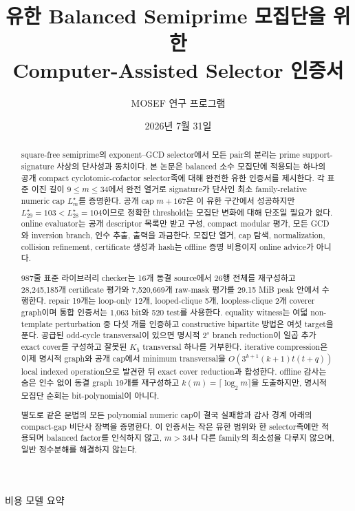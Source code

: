 \documentclass[11pt]{article}
\title{유한 Balanced Semiprime 모집단을 위한\\
Computer-Assisted Selector 인증서}
\author{MOSEF 연구 프로그램}
\date{2026년 7월 31일}
\begin{document}
\maketitle

\begin{abstract}
square-free semiprime의 exponent--GCD selector에서 모든 pair의 분리는
prime support-signature 사상의 단사성과 동치이다. 본 논문은 balanced
소수 모집단에 적용되는 하나의 공개 compact cyclotomic-cofactor
selector족에 대해 완전한 유한 인증서를 제시한다. 각 표준 이진 길이
\(9\le m\le34\)에서 완전 열거로 signature가 단사인 최소
family-relative numeric cap \(L_m^\star\)를 증명한다. 공개 cap
\(m+167\)은 이 유한 구간에서 성공하지만
\(L_{29}^\star=103<L_{28}^\star=104\)이므로 정확한 threshold는
모집단 변화에 대해 단조일 필요가 없다. online evaluator는 공개
descriptor 목록만 받고 구성, compact modular 평가, 모든 GCD와
inversion branch, 인수 추출, 출력을 과금한다. 모집단 열거, cap 탐색,
normalization, collision refinement, certificate 생성과 hash는 offline
증명 비용이지 online advice가 아니다.

987줄 표준 라이브러리 checker는 16개 동결 source에서 26행 전체를
재구성하고 28,245,185개 certificate 평가와 7,520,669개 raw-mask
평가를 29.15 MiB peak 안에서 수행한다. repair 19개는 loop-only 12개,
looped-clique 5개, loopless-clique 2개 coverer graph이며 통합
인증서는 1,063 bit와 520 test를 사용한다. equality witness는 여덟
non-template perturbation 중 다섯 개를 인증하고 constructive
bipartite 방법은 여섯 target을 푼다. 공급된 odd-cycle transversal이
있으면 명시적 \(2^s\) branch reduction이 일곱 추가 exact cover를
구성하고 잘못된 \(K_5\) transversal 하나를 거부한다. iterative
compression은 이제 명시적 graph와 공개 cap에서 minimum transversal을
\(O(3^{k+1}(k+1)t(t+q))\) local indexed operation으로 발견한 뒤 exact
cover reduction과 합성한다. offline 감사는 숨은 인수 없이 동결 graph
19개를 재구성하고 \(k(m)=\lceil\log_2m\rceil\)을 도출하지만, 명시적
모집단 순회는 bit-polynomial이 아니다.

별도로 같은 문법의 모든 polynomial numeric cap이 결국 실패함과
감사 경계 아래의 compact-gap 비단사 장벽을 증명한다. 이 인증서는
작은 유한 범위와 한 selector족에만 적용되며 balanced factor를
인식하지 않고, \(m>34\)나 다른 family의 최소성을 다루지 않으며,
일반 정수분해를 해결하지 않는다.
\end{abstract}

\begin{costmodel}{비용 모델 요약}
\end{costmodel}
\end{document}
